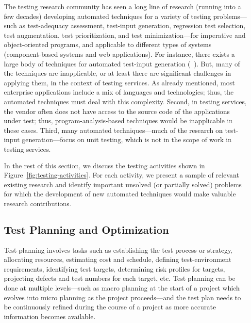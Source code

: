 The testing research community has seen a long line of research (running into a
few decades) developing automated techniques for a variety of testing
problems---such as test-adequacy assessment, test-input generation, regression
test selection, test augmentation, test prioritization, and test
minimization---for imperative and object-oriented programs, and applicable to
different types of systems (\eg component-based systems and web
applications). For instance, there exists a large body of techniques for
automated test-input generation (\eg ~\cite{Artzi:2011, Boyapati:2002, cadar08,
  Clarke:1976, Ferguson:1996, godefroid05, Gross:2012, Harman:2010, king76jul,
  korel90aug, Pacheco:2007, sen05, thummalapenta:2011, Tillmann:2005,
  visser04}).  But, many of the techniques are inapplicable, or at least there
are significant challenges in applying them, in the context of testing
services. As already mentioned, most enterprise applications include a mix of
languages and technologies; thus, the automated techniques must deal with this
complexity. Second, in testing services, the vendor often does not have access
to the source code of the applications under test; thus, program-analysis-based
techniques would be inapplicable in these cases. Third, many automated
techniques---\eg much of the research on test-input generation---focus on unit
testing, which is not in the scope of work in testing services.

In the rest of this section, we discuss the testing activities shown in
Figure~\ref{fig:testing-activities}. For each activity, we present a sample of
relevant existing research and identify important unsolved (or partially solved)
problems for which the development of new automated techniques would make
valuable research contributions.

\subsection{Test Planning and Optimization}
\label{sec:test-planning}

Test planning involves tasks such as establishing the test process or strategy,
allocating resources, estimating cost and schedule, defining test-environment
requirements, identifying test targets, determining risk profiles for targets,
projecting defects and test numbers for each target, etc.  Test planning can be
done at multiple levels---such as macro planning at the start of a project which
evolves into micro planning as the project proceeds---and the test plan needs to
be continuously refined during the course of a project as more accurate
information becomes available.

